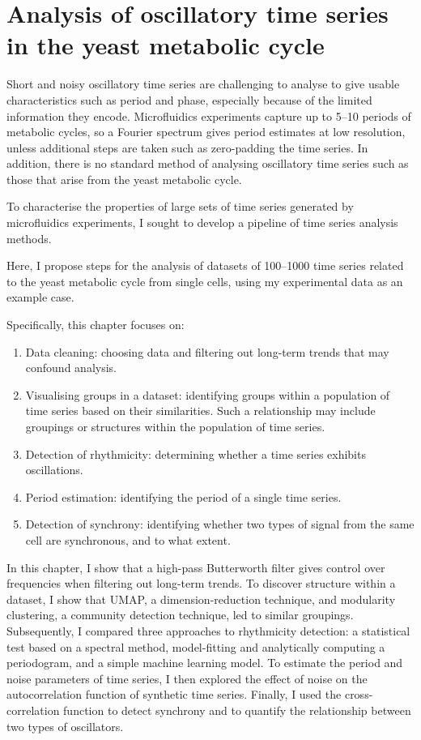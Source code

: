 \chapter{Analysis of oscillatory time series in the yeast metabolic cycle}
\label{ch:analysis}

Short and noisy oscillatory time series are challenging to analyse to give usable characteristics such as period and phase, especially because of the limited information they encode.
Microfluidics experiments capture up to 5--10 periods of metabolic cycles, so a Fourier spectrum gives period estimates at low resolution, unless additional steps are taken such as zero-padding the time series.
In addition, there is no standard method of analysing oscillatory time series such as those that arise from the yeast metabolic cycle.

To characterise the properties of large sets of time series generated by microfluidics experiments, I sought to develop a pipeline of time series analysis methods.

Here, I propose steps for the analysis of datasets of 100--1000 time series related to the yeast metabolic cycle from single cells, using my experimental data as an example case.

Specifically, this chapter focuses on:
\begin{enumerate}
  \item Data cleaning: choosing data and filtering out long-term trends that may confound analysis.
  \item Visualising groups in a dataset: identifying groups within a population of time series based on their similarities.
        Such a relationship may include groupings or structures within the population of time series.
  \item Detection of rhythmicity: determining whether a time series exhibits oscillations.
  \item Period estimation: identifying the period of a single time series.
  \item Detection of synchrony: identifying whether two types of signal from the same cell are synchronous, and to what extent.
\end{enumerate}

In this chapter, I show that a high-pass Butterworth filter gives control over frequencies when filtering out long-term trends.
To discover structure within a dataset, I show that UMAP, a dimension-reduction technique, and modularity clustering, a community detection technique, led to similar groupings.
Subsequently, I compared three approaches to rhythmicity detection: a statistical test based on a spectral method, model-fitting and analytically computing a periodogram, and a simple machine learning model.
To estimate the period and noise parameters of time series, I then explored the effect of noise on the autocorrelation function of synthetic time series.
Finally, I used the cross-correlation function to detect synchrony and to quantify the relationship between two types of oscillators.


